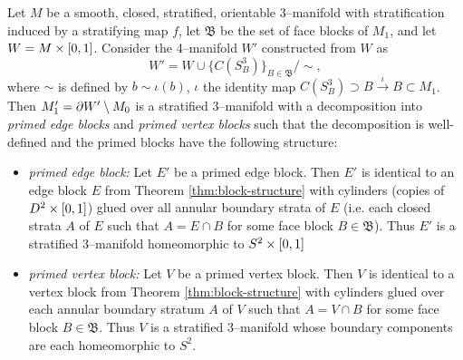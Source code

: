 \begin{theorem}
	\label{thm:primed-block-structure}
	Let $M$ be a smooth, closed, stratified, orientable 3--manifold with stratification induced by a stratifying map $f$, let $\mathfrak{B}$ be the set of face blocks of $M_1$, and let $W=M\times[0,1]$.
	Consider the 4--manifold $W'$ constructed from $W$ as
	\[
		W' = W\cup\{C(S_B^3)\}_{B\in \mathfrak{B}} / \sim,
	\]
	where $\sim$ is defined by $b\sim \iota(b)$, $\iota$ the identity map $C(S_B^3)\supset B\overset{\iota}{\to} B\subset M_1$.
	Then $M_1'=\partial W'\setminus M_0$ is a stratified 3--manifold with a decomposition into \emph{primed edge blocks} and \emph{primed vertex blocks} such that the decomposition is well-defined and the primed blocks have the following structure:
	\begin{itemize}
		\item \emph{primed edge block:}
		Let $E'$ be a primed edge block.
		Then $E'$ is identical to an edge block $E$ from Theorem \ref{thm:block-structure} with cylinders (copies of $D^2\times[0,1]$) glued over all annular boundary strata of $E$ (i.e. each closed strata $A$ of $E$ such that $A=E\cap B$ for some face block $B\in\mathfrak{B}$).
		Thus $E'$ is a stratified 3--manifold homeomorphic to $S^2\times[0,1]$
		
		\item \emph{primed vertex block:}
		Let $V$ be a primed vertex block.
		Then $V$ is identical to a vertex block from Theorem \ref{thm:block-structure} with cylinders glued over each annular boundary stratum $A$ of $V$ such that $A=V\cap B$ for some face block $B\in\mathfrak{B}$.
		Thus $V$ is a stratified 3--manifold whose boundary components are each homeomorphic to $S^2$.
	\end{itemize}
\end{theorem}

